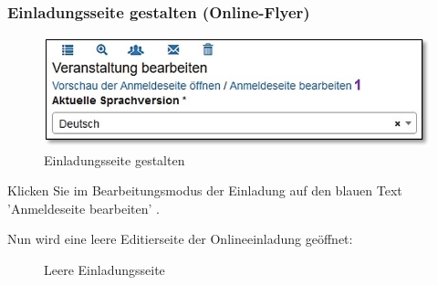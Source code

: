 \pagebreak
\subsubsection{Einladungsseite gestalten (Online-Flyer)}
\label{bkm:Ref112017101}

\begin{figure}   
  \vspace{-30pt}      
  \begin{center}
    \includegraphics[width=1\linewidth]{../chapters/10_CRM/pictures/crm_Einladung_gestalten_Link.jpg}
  \end{center}
  \vspace{-20pt}
  \caption{Einladungsseite gestalten}
  \vspace{-10pt}
\end{figure}

Klicken Sie im Bearbeitungsmodus der Einladung auf den blauen Text 'Anmeldeseite bearbeiten' . 


\vspace{2cm}

Nun wird eine leere Editierseite der Onlineeinladung geöffnet:

\begin{figure}[H]
\caption{Leere Einladungsseite}
\end{figure}

